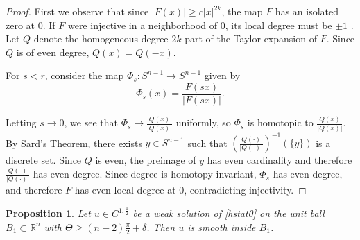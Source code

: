 \documentclass[12pt,reqno]{amsart}%
\theoremstyle{plain}
\newtheorem{proposition}[theorem]{Proposition}
\numberwithin{equation}{section}
\theoremstyle{definition}
\theoremstyle{remark}
\newcommand{\R}{\mathbb{R}}
\begin{document}
\begin{proof} 
First we observe that since $|F(x)| \geq c |x|^{2k} $, the map $F$ has an isolated zero at $0$. If $F$ were injective in a neighborhood of $0$, its local degree must be $\pm 1$ \cite{Hatcher}. Let $Q$ denote the homogeneous degree $2k$ part of the Taylor expansion of $F$. Since $Q$ is of even degree, $Q(x) = Q(-x)$. 


For $s < r$, consider the map $\Phi_s:S^{n-1} \to S^{n-1}$ given by \[\Phi_s(x) = \frac{ F(sx)}{|F(sx)|}.\]

Letting $s \to 0$, we see that $\Phi_s \to \frac{Q(x)}{|Q(x)|} $ uniformly, so $\Phi_s$ is homotopic to $ \frac{Q(x)}{|Q(x)|}$. By Sard's Theorem, there exists $y \in S^{n-1}$ such that $\left ( \frac{ Q(\cdot ) }{|Q(\cdot)| } \right )^{-1} ( \{ y \} ) $ is a discrete set. Since $Q$ is even, the preimage of $y$ has even cardinality and therefore $\frac{ Q(\cdot ) }{|Q(\cdot)| }$ has even degree. Since degree is homotopy invariant, $\Phi_s$ has even degree, and therefore $F$ has even local degree at $0$, contradicting injectivity. 
\end{proof} 

\begin{proposition}\label{holder_half} Let $u \in C^{1, \frac 12} $ be a weak solution of \eqref{hstat0} on the unit ball $B_1 \subset \R^n $ with $\Theta \geq (n-2) \frac \pi 2 + \delta $. Then $u$ is smooth inside $B_1$. \label{Holder1/2}
\end{proposition}
\end{document}
